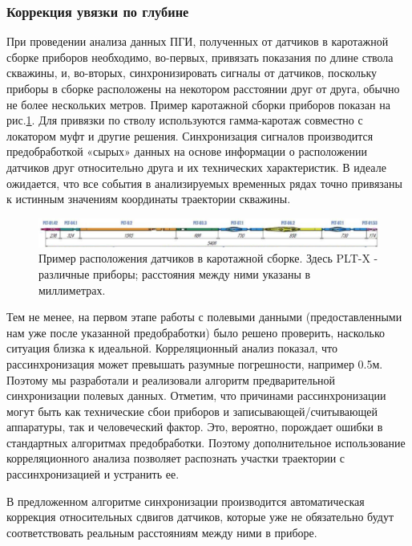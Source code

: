 \subsubsection{Коррекция увязки по глубине}
\par
При проведении анализа данных ПГИ, полученных от датчиков в каротажной сборке приборов необходимо, во-первых, привязать показания по длине ствола скважины, и, во-вторых, синхронизировать сигналы от датчиков, поскольку приборы в сборке расположены на некотором расстоянии друг от друга, обычно не более нескольких метров. Пример каротажной сборки приборов показан на рис.\ref{fig:log_example}. Для привязки по стволу используются гамма-каротаж совместно с локатором муфт \cite{169255} и другие решения. Синхронизация сигналов производится предобработкой «сырых» данных на основе информации о расположении датчиков друг относительно друга и их технических характеристик. В идеале ожидается, что все события в анализируемых временных рядах точно привязаны к истинным значениям координаты траектории скважины. 

\begin{figure}[H]
\centering
\includegraphics[width=1\textwidth]{DM/log_example.png}
\caption{Пример расположения датчиков в каротажной сборке. Здесь PLT-X - различные приборы; расстояния между ними указаны в миллиметрах.}
\label{fig:log_example}
\end{figure}

\par
Тем не менее, на первом этапе работы с полевыми данными (предоставленными нам уже после указанной предобработки) было решено проверить, насколько ситуация близка к идеальной. Корреляционный анализ показал, что рассинхронизация может превышать разумные погрешности, например 0.5м. Поэтому мы разработали и реализовали алгоритм предварительной синхронизации полевых данных. Отметим, что причинами рассинхронизации могут быть как технические сбои приборов и записывающей/считывающей аппаратуры, так и человеческий фактор. Это, вероятно, порождает ошибки в стандартных алгоритмах предобработки. Поэтому дополнительное использование корреляционного анализа позволяет распознать участки траектории с рассинхронизацией и устранить ее.
\par
В предложенном алгоритме синхронизации производится автоматическая коррекция относительных сдвигов датчиков, которые уже не обязательно будут соответствовать реальным расстояниям между ними в приборе.


